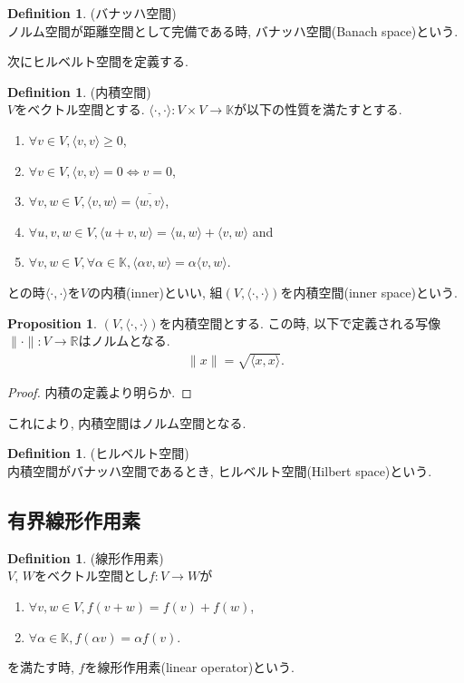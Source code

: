 \documentclass[11pt, a4paper, dvipdfmx]{jsarticle}
\theoremstyle{definition}
\def\inner<#1>{\langle #1 \rangle}
\newtheorem{Definition+}[Axiom+]{Definition}
\newtheorem{Proposition+}[Axiom+]{Proposition}
\newcommand{\R}{\mathbb{R}}
\newcommand{\K}{\mathbb{K}}
\newcommand{\innersp}{(V, \inner<\cdot, \cdot>)}
\begin{document}
\begin{Definition+}(バナッハ空間)\\
    ノルム空間が距離空間として完備である時, バナッハ空間(Banach space)という.
\end{Definition+}
次にヒルベルト空間を定義する.
\begin{Definition+}(内積空間)\\
    $V$をベクトル空間とする. $\inner<\cdot, \cdot>: V\times V\to\K$が以下の性質を満たすとする.
    \begin{enumerate}
        \item $\forall v\in V, \inner<v, v>\geq 0$,
        \item $\forall v\in V, \inner<v, v> = 0\iff v = 0$,
        \item $\forall v, w\in V, \inner<v, w> = \overline{\inner<w, v>}$,
        \item $\forall u, v, w\in V, \inner<u + v, w> = \inner<u, w> + \inner<v, w>$ and
        \item $\forall v, w\in V, \forall\alpha\in\K, \inner<\alpha v, w> = \alpha\inner<v, w>$.
    \end{enumerate}
    との時$\inner<\cdot, \cdot>$を$V$の内積(inner)といい, 組$(V, \inner<\cdot, \cdot>)$を内積空間(inner space)という.
\end{Definition+}
\begin{Proposition+}
    $\innersp$を内積空間とする. この時, 以下で定義される写像$\|\cdot\|:V\to\R$はノルムとなる.
    \begin{align*}
        \|x\| = \sqrt{\inner<x, x>}.
    \end{align*}
    \begin{proof}
        内積の定義より明らか.
    \end{proof}
\end{Proposition+}
これにより, 内積空間はノルム空間となる.
\begin{Definition+}(ヒルベルト空間)\\
    内積空間がバナッハ空間であるとき, ヒルベルト空間(Hilbert space)という.
\end{Definition+}
\subsection{有界線形作用素}
\begin{Definition+}(線形作用素)\\
    $V$, $W$をベクトル空間とし$f:V\to W$が
    \begin{enumerate}
        \item $\forall v, w\in V, f(v + w) = f(v) + f(w)$,
        \item $\forall\alpha\in\K, f(\alpha v) = \alpha f(v)$.
    \end{enumerate}
    を満たす時, $f$を線形作用素(linear operator)という.
\end{Definition+}
\end{document}
